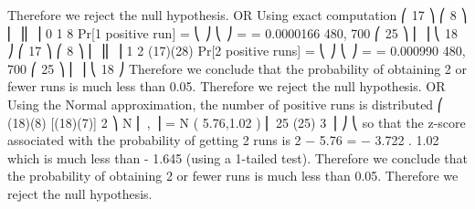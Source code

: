 \documentclass[a4paper,12pt]{article}
\begin{document}
Therefore we reject the null hypothesis.
OR
Using exact computation
⎛ 17 ⎞ ⎛ 8 ⎞
⎜ ⎟⎜ ⎟
0 1
8
Pr[1 positive run] = ⎝ ⎠ ⎝ ⎠ =
= 0.0000166
480, 700
⎛ 25 ⎞
⎜ ⎟
⎝ 18 ⎠
⎛ 17 ⎞ ⎛ 8 ⎞
⎜ ⎟⎜ ⎟
1
2
(17)(28)
Pr[2 positive runs] = ⎝ ⎠ ⎝ ⎠ =
= 0.000990
480, 700
⎛ 25 ⎞
⎜ ⎟
⎝ 18 ⎠
Therefore we conclude that the probability of obtaining 2 or fewer runs is much less than 0.05.
Therefore we reject the null hypothesis.
OR
Using the Normal approximation, the number of positive runs is distributed
⎛ (18)(8) [(18)(7)] 2 ⎞
N ⎜
,
⎟ = N ( 5.76,1.02 )
⎜ 25
(25) 3 ⎟ ⎠
⎝
so that the z-score associated with the probability of getting 2 runs
is
2 − 5.76
= − 3.722 .
1.02
which is much less than - 1.645 (using a 1-tailed test).
Therefore we conclude that the probability of obtaining 2 or fewer runs is much less than 0.05.
Therefore we reject the null hypothesis.
\end{document}
